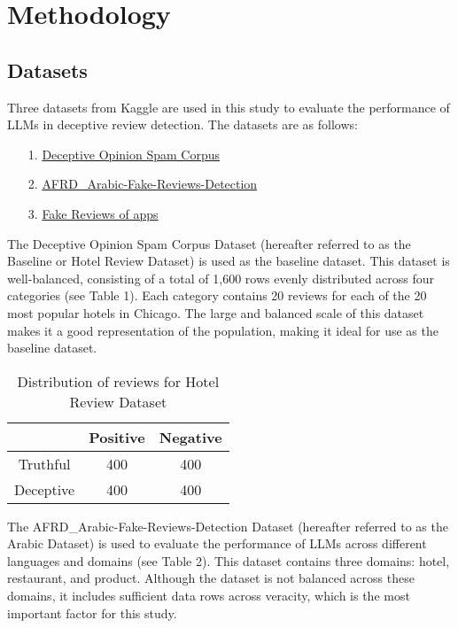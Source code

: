 \documentclass[sigconf, nonacm]{acmart}
\theoremstyle{definition}
\begin{document}
\section{Methodology}

\subsection{Datasets}
Three datasets from Kaggle are used in this study to evaluate the performance of LLMs in deceptive review detection. The datasets are as follows:

\begin{itemize}
  \item[1.] \href{https://www.kaggle.com/datasets/rtatman/deceptive-opinion-spam-corpus}{Deceptive Opinion Spam Corpus} \cite{ott-etal-2011-finding, ott-etal-2013-negative}
  \item[2.] \href{https://www.kaggle.com/datasets/shathaalturke/afrd-arabic-fake-reviews-detection}{AFRD\_Arabic-Fake-Reviews-Detection}
  \item[3.] \href{https://www.kaggle.com/datasets/umairanjacks/fake-reviews-of-apps}{Fake Reviews of apps}
\end{itemize}

The Deceptive Opinion Spam Corpus Dataset (hereafter referred to as the Baseline or Hotel Review Dataset) is used as the baseline dataset. This dataset is well-balanced, consisting of a total of 1,600 rows evenly distributed across four categories (see Table 1). Each category contains 20 reviews for each of the 20 most popular hotels in Chicago. The large and balanced scale of this dataset makes it a good representation of the population, making it ideal for use as the baseline dataset.

\begin{table}[h!]
  \centering
  \caption{Distribution of reviews for Hotel Review Dataset}
  \begin{tabular}{c c c}
    \toprule
              & Positive & Negative \\
    \midrule
    Truthful  & 400      & 400      \\
    Deceptive & 400      & 400      \\
    \bottomrule
  \end{tabular}
\end{table}

The AFRD\_Arabic-Fake-Reviews-Detection Dataset (hereafter referred to as the Arabic Dataset) is used to evaluate the performance of LLMs across different languages and domains (see Table 2). This dataset contains three domains: hotel, restaurant, and product. Although the dataset is not balanced across these domains, it includes sufficient data rows across veracity, which is the most important factor for this study.
\end{document}
